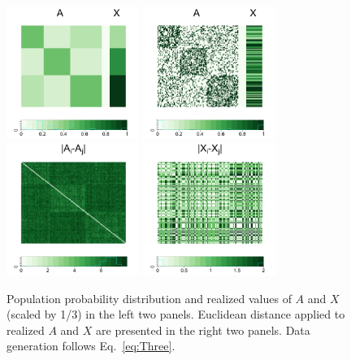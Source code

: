 \documentclass[12pt]{article}
\theoremstyle{definition}
\begin{document}
\begin{figure}[H]
	\centering
	\includegraphics[width=1.7in]{../Figure/pmat.png}
	\includegraphics[width=1.7in]{../Figure/Amat.png}
	\includegraphics[width=1.7in]{../Figure/distA.png}
	\includegraphics[width=1.7in]{../Figure/distX.png}
	\caption{Population probability distribution and realized values of $A$ and $X$ (scaled by 1/3) in the left two panels. Euclidean distance applied to realized $A$ and $X$ are presented in the right two panels. Data generation follows Eq.~\ref{eq:Three}.}
	\label{fig:matrics}
\end{figure}	
\end{document}
